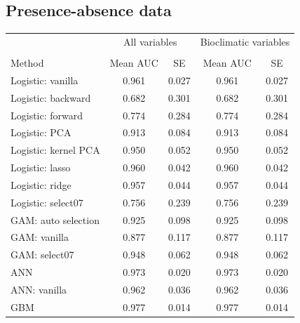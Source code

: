 \begin{figure}[!htb]
\center
{}
\end{figure}


\subsection{Presence-absence data}

\begin{table}[!htb]
\center
\begin{tabular}{lcccc}
 & \multicolumn{2}{c}{All variables} & \multicolumn{2}{c}{Bioclimatic variables}\\
\cline{2-3} \cline{4-5} \\
Method & Mean AUC & SE & Mean AUC & SE \\
Logistic: vanilla    & 0.961 & 0.027 & 0.961& 0.027 \\
Logistic: backward   & 0.682 & 0.301 & 0.682& 0.301 \\
Logistic: forward    & 0.774 & 0.284 & 0.774& 0.284 \\
Logistic: PCA        & 0.913 & 0.084 & 0.913& 0.084 \\
Logistic: kernel PCA & 0.950 & 0.052 & 0.950& 0.052 \\
Logistic: lasso      & 0.960 & 0.042 & 0.960& 0.042 \\
Logistic: ridge      & 0.957 & 0.044 & 0.957& 0.044 \\
Logistic: select07   & 0.756 & 0.239 & 0.756& 0.239 \\
GAM: auto selection  & 0.925 & 0.098 & 0.925& 0.098 \\
GAM: vanilla         & 0.877 & 0.117 & 0.877& 0.117 \\
GAM: select07        & 0.948 & 0.062 & 0.948& 0.062 \\
ANN                  & 0.973 & 0.020 & 0.973& 0.020 \\
ANN: vanilla         & 0.962 & 0.036 & 0.962& 0.036 \\
GBM                  & 0.977 & 0.014 & 0.977& 0.014 \\
\bottomrule

\end{tabular}
\end{table}





